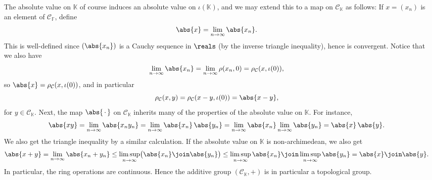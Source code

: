 \documentclass[a4paper, 11pt]{memoir}
\theoremstyle{plaincustomnumber}
\theoremstyle{changedotbreakcustomnumber}
\newcommand{\calC}{\mathcal{C}}
\newcommand{\field}{\mathbb{F}}
\newcommand{\fieldK}{\mathbb{K}}
\begin{document}
The absolute value on $\fieldK$ of course induces an absolute value on $\iota(\fieldK)$, and we may extend this to a map on $\calC_\fieldK$ as follows: If $x = (x_n)$ is an element of $\calC_\field$, define
%
\begin{equation*}
    \abs{x}
        = \lim_{n \to \infty} \abs{x_n}.
\end{equation*}
%
This is well-defined since $(\abs{x_n})$ is a Cauchy sequence in $\reals$ (by the inverse triangle inequality), hence is convergent. Notice that we also have
%
\begin{equation*}
    \lim_{n \to \infty} \abs{x_n}
        = \lim_{n \to \infty} \rho(x_n,0)
        = \rho_\calC(x,\iota(0)),
\end{equation*}
%
so $\abs{x} = \rho_\calC(x,\iota(0))$, and in particular
%
\begin{equation*}
    \rho_\calC(x,y)
        = \rho_\calC(x-y,\iota(0))
        = \abs{x-y},
\end{equation*}
%
for $y \in \calC_\fieldK$. Next, the map $\abs{\,\cdot\,}$ on $\calC_\fieldK$ inherits many of the properties of the absolute value on $\fieldK$. For instance,
%
\begin{equation*}
    \abs{xy}
        = \lim_{n \to \infty} \abs{x_n y_n}
        = \lim_{n \to \infty} \abs{x_n} \, \abs{y_n}
        = \lim_{n \to \infty} \abs{x_n} \lim_{n \to \infty} \abs{y_n}
        = \abs{x} \, \abs{y}.
\end{equation*}
%
We also get the triangle inequality by a similar calculation. If the absolute value on $\fieldK$ is non-archimedean, we also get
%
\begin{equation*}
    \abs{x+y}
        = \lim_{n \to \infty} \abs{x_n + y_n}
        \leq \limsup_{n \to \infty} \bigl( \abs{x_n} \join \abs{y_n} \bigr)
        \leq \limsup_{n \to \infty} \abs{x_n} \join \limsup_{n \to \infty} \abs{y_n}
        = \abs{x} \join \abs{y}.
\end{equation*}
%
In particular, the ring operations are continuous. Hence the additive group $(\calC_\fieldK,+)$ is in particular a topological group.
\end{document}
